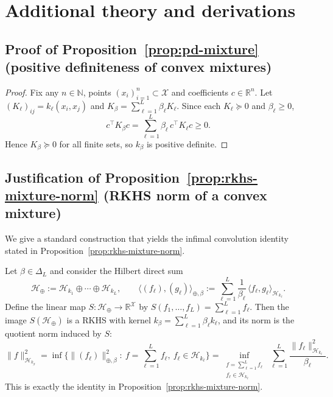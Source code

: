 \documentclass[11pt]{article}
\theoremstyle{remark}
\newcommand{\Hk}{\mathcal{H}}
\begin{document}


\appendix

\section{Additional theory and derivations}
\label{app:theory}

\subsection{Proof of Proposition~\ref{prop:pd-mixture} (positive definiteness of convex mixtures)}
\label{app:pd-mixture-proof}

\begin{proof}
Fix any $n\in\mathbb{N}$, points $(x_i)_{i=1}^n\subset\mathcal{X}$ and coefficients $c\in\mathbb{R}^n$.
Let $(K_\ell)_{ij}=k_\ell(x_i,x_j)$ and $K_\beta=\sum_{\ell=1}^L \beta_\ell K_\ell$.
Since each $K_\ell\succeq 0$ and $\beta_\ell\ge 0$,
\[
c^\top K_\beta c
=\sum_{\ell=1}^L \beta_\ell\, c^\top K_\ell c
\ge 0.
\]
Hence $K_\beta\succeq 0$ for all finite sets, so $k_\beta$ is positive definite.
\end{proof}

\subsection{Justification of Proposition~\ref{prop:rkhs-mixture-norm} (RKHS norm of a convex mixture)}
\label{app:rkhs-mixture-proof}

We give a standard construction that yields the infimal convolution identity stated in
Proposition~\ref{prop:rkhs-mixture-norm}.

Let $\beta\in\Delta_L$ and consider the Hilbert direct sum
\[
\mathcal{H}_\oplus
:=
\Hk_{k_1}\oplus\cdots\oplus \Hk_{k_L},
\qquad
\langle (f_\ell),(g_\ell)\rangle_{\oplus,\beta}
:=
\sum_{\ell=1}^L \frac{1}{\beta_\ell}\,\langle f_\ell,g_\ell\rangle_{\Hk_{k_\ell}}.
\]
Define the linear map $S:\mathcal{H}_\oplus\to \mathbb{R}^\mathcal{X}$ by
$S(f_1,\dots,f_L)=\sum_{\ell=1}^L f_\ell$.
Then the image $S(\mathcal{H}_\oplus)$ is a RKHS with kernel $k_\beta=\sum_{\ell=1}^L \beta_\ell k_\ell$,
and its norm is the quotient norm induced by $S$:
\[
\|f\|_{\Hk_{k_\beta}}^2
=
\inf\Big\{\|(f_\ell)\|_{\oplus,\beta}^2:\ f=\sum_{\ell=1}^L f_\ell,\ f_\ell\in\Hk_{k_\ell}\Big\}
=
\inf_{\substack{f=\sum_{\ell=1}^L f_\ell\\ f_\ell\in \Hk_{k_\ell}}}
\ \sum_{\ell=1}^L \frac{\|f_\ell\|^2_{\Hk_{k_\ell}}}{\beta_\ell}.
\]
This is exactly the identity in Proposition~\ref{prop:rkhs-mixture-norm}.
\end{document}
